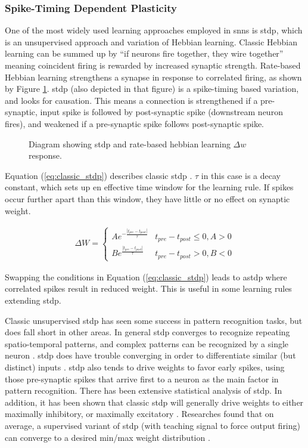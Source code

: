 \documentclass[conference]{IEEEtran}
\newcommand{\asvgf}[4]{
	\begin{figure}[!htbp]
    	\centering
		\adjustbox{max width=#4\linewidth}{}
        \caption{#2.}
        \label{#3}
	\end{figure}
}
\newcommand{\eq}[1]{Equation (\ref{#1})}
\begin{document}
\subsubsection{Spike-Timing Dependent Plasticity}
One of the most widely used learning approaches employed in \glspl{snn} is
\gls{stdp}, which is an unsupervised approach and variation of Hebbian
learning. Classic Hebbian learning can be summed up by ``if neurons fire
together, they wire together'' meaning coincident firing is rewarded by
increased synaptic strength. Rate-based Hebbian learning strengthens a
synapse in response to correlated firing, as shown by Figure
\ref{fig:heb_rate_stdp}. \Gls{stdp} (also depicted in that figure) is a
spike-timing based variation, and looks for causation. This means a
connection is strengthened if a pre-synaptic, input spike is followed by
post-synaptic spike (downstream neuron fires), and weakened if a
pre-synaptic spike follows post-synaptic spike.

\asvgf{figures/heb_diagrams.svg}{Diagram showing \gls{stdp} and rate-based
  hebbian learning $\Delta w$ response}{fig:heb_rate_stdp}{0.6}

\eq{eq:classic_stdp} describes classic \gls{stdp}
\parencite{tavanaei_2019}. $\tau$ in this case is a decay constant, which
sets up en effective time window for the learning rule. If spikes occur
further apart than this window, they have little or no effect on synaptic
weight.

\begin{align}
  \Delta W =
  \begin{cases}
    Ae^{-\frac{|t_{pre}-t_{post}|}{\tau}} & t_{pre} - t_{post} \leq 0, A > 0
    \\ Be^{\frac{|t_{pre}-t_{post}|}{\tau}} & t_{pre} - t_{post} > 0, B < 0
  \end{cases} \label{eq:classic_stdp}
\end{align}

Swapping the conditions in \eq{eq:classic_stdp} leads to
\gls{astdp} where correlated spikes result in reduced weight. This
is useful in some learning rules extending \gls{stdp}.

Classic unsupervised \gls{stdp} has seen some success in pattern recognition
tasks, but does fall short in other areas. In general \gls{stdp} converges to
recognize repeating spatio-temporal patterns, and complex patterns can be
recognized by a single neuron \parencite{tavanaei_2019}. \Gls{stdp} does have
trouble converging in order to differentiate similar (but distinct) inputs
\parencite{vigneron_2020}. \Gls{stdp} also tends to drive weights to favor early
spikes, using those pre-synaptic spikes that arrive first to a neuron as the
main factor in pattern recognition. There has been extensive statistical
analysis of \gls{stdp}. In addition, it has been shown that classic \gls{stdp}
will generally drive weights to either maximally inhibitory, or maximally
excitatory \parencite{legenstein_2005}. Researches found that on average, a
supervised variant of \gls{stdp} (with teaching signal to force output firing)
can converge to a desired min/max weight distribution
\parencite{legenstein_2005}.
\end{document}

